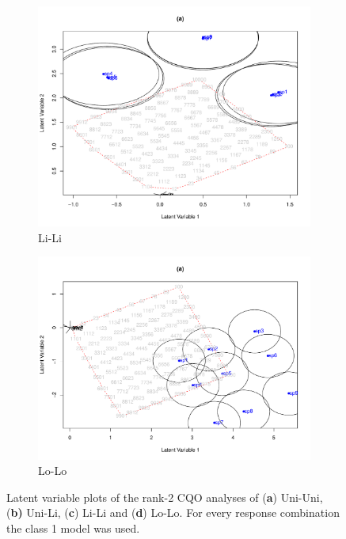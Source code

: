 \begin{figure}[h!]
\begin{subfigure}{.5\textwidth}
				\centering	
				\includegraphics[width=1\linewidth]{"../02_Figures/CQOSM3"}
				\caption{Li-Li}
			\end{subfigure}
			\begin{subfigure}{.5\textwidth}		
				\centering
				\includegraphics[width=1\linewidth]{"../02_Figures/CQOSM4"}
				\caption{Lo-Lo}
			\end{subfigure}
			
			\caption{Latent variable plots of the rank-2 CQO analyses of (\textbf{a}) Uni-Uni, (\textbf{b)} Uni-Li, (\textbf{c}) Li-Li and (\textbf{d}) Lo-Lo. For every response combination the class 1 model was used.}
			\label{fig:smcqoord}
			
		\end{figure}

